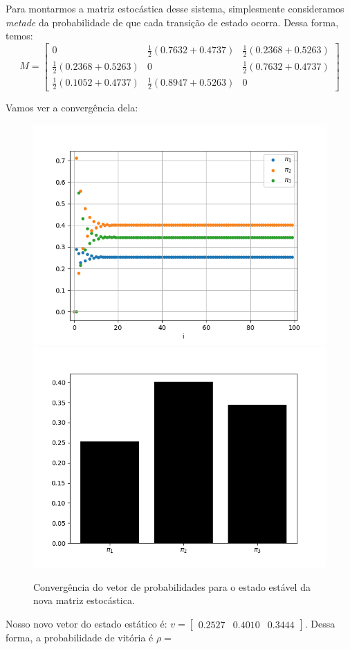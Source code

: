 \documentclass[12pt]{article}
\begin{document}
Para montarmos a matriz estocástica desse sistema, simplesmente consideramos \textit{metade} da probabilidade de que cada transição de estado ocorra. Dessa forma, temos:\\

$$
M = 
\begin{bmatrix}
0 & \frac{1}{2}(0.7632 + 0.4737)  & \frac{1}{2}(0.2368 + 0.5263)\\
\frac{1}{2}(0.2368 + 0.5263) & 0 & \frac{1}{2}(0.7632 + 0.4737)\\
\frac{1}{2}(0.1052 + 0.4737) & \frac{1}{2}(0.8947 + 0.5263) & 0
\end{bmatrix}
$$

Vamos ver a convergência dela:

\begin{figure}[H]
\centering
\includegraphics[scale=0.55]{graph9.png}
\includegraphics[scale=0.55]{graph10.png}
\caption{Convergência do vetor de probabilidades para o estado estável da nova matriz estocástica.}
\end{figure}

Nosso novo vetor do estado estático é: $v = \begin{bmatrix} 0.2527 & 0.4010 & 0.3444 \end{bmatrix}$. Dessa forma, a probabilidade de vitória é $\rho = $\\
\end{document}
